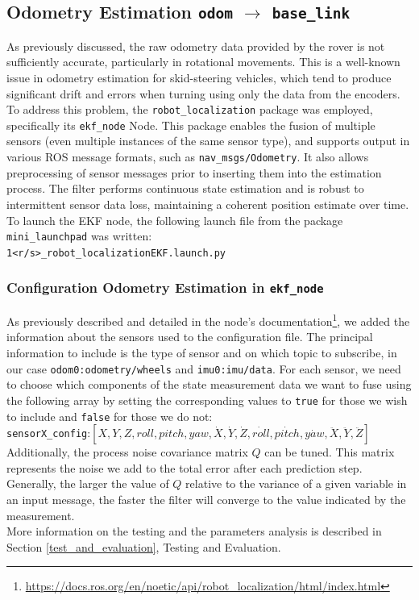 \subsection{Odometry Estimation \texttt{odom} $\rightarrow$ \texttt{base\_link}}
As previously discussed, the raw odometry data provided by the rover is not sufficiently accurate, particularly in rotational movements. This is a well-known issue in odometry estimation for skid-steering vehicles, which tend to produce significant drift and errors when turning using only the data from the encoders.\\
To address this problem, the \texttt{robot\_localization} package\cite{MooreStouchKeneralizedEkf2014} was employed, specifically its \texttt{ekf\_node} Node.
This package enables the fusion of multiple sensors (even multiple instances of the same sensor type), and supports output in various ROS message formats, such as \texttt{nav\_msgs/Odometry}. It also allows preprocessing of sensor messages prior to inserting them into the estimation process. The filter performs continuous state estimation and is robust to intermittent sensor data loss, maintaining a coherent position estimate over time.\\
To launch the EKF node, the following launch file from the package \texttt{mini\_launchpad} was written:\\
\hspace*{10mm}\texttt{1<r/s>\_robot\_localizationEKF.launch.py}

\subsubsection{Configuration Odometry Estimation in \texttt{ekf\_node}}
As previously described and detailed in the node’s documentation\footnote{\href{https://docs.ros.org/en/noetic/api/robot_localization/html/index.html}{https://docs.ros.org/en/noetic/api/robot\_localization/html/index.html}}, we added the information about the sensors used to the configuration file. The principal information to include is the type of sensor and on which topic to subscribe, in our case \texttt{odom0:odometry/wheels} and \texttt{imu0:imu/data}. For each sensor, we need to choose which components of the state measurement data we want to fuse using the following array by setting the corresponding values to \texttt{true} for those we wish to include and \texttt{false} for those we do not:\\
\texttt{sensorX\_config}:$ [X, Y, Z, roll, pitch, yaw, \dot{X}, \dot{Y}, \dot{Z}, \dot{roll}, \dot{pitch}, \dot{yaw}, \ddot{X}, \ddot{Y}, \ddot{Z}] $\\
Additionally, the process noise covariance matrix $ Q $ can be tuned. This matrix represents the noise we add to the total error after each prediction step. Generally, the larger the value of $ Q $ relative to the variance of a given variable in an input message, the faster the filter will converge to the value indicated by the measurement.\\
More information on the testing and the parameters analysis is described in Section \ref{test_and_evaluation}, Testing and Evaluation.


